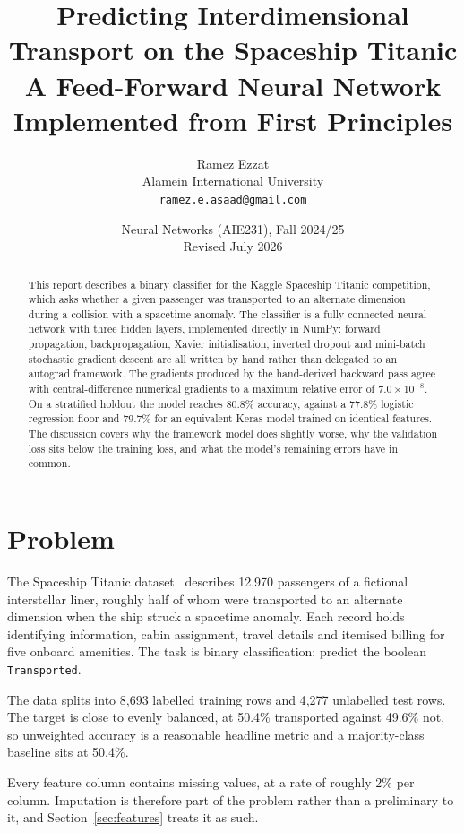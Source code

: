 \documentclass[11pt,a4paper]{article}
\title{\textbf{Predicting Interdimensional Transport on the Spaceship Titanic}\\[0.3em]
       \large A Feed-Forward Neural Network Implemented from First Principles}
\author{Ramez Ezzat\\
        \small Alamein International University\\
        \small \texttt{ramez.e.asaad@gmail.com}}
\date{\small Neural Networks (AIE231), Fall 2024/25 \\ \small Revised July 2026}
\begin{document}
\maketitle

\begin{abstract}
\noindent
This report describes a binary classifier for the Kaggle Spaceship Titanic
competition, which asks whether a given passenger was transported to an
alternate dimension during a collision with a spacetime anomaly. The classifier
is a fully connected neural network with three hidden layers, implemented
directly in NumPy: forward propagation, backpropagation, Xavier initialisation,
inverted dropout and mini-batch stochastic gradient descent are all written by
hand rather than delegated to an autograd framework. The gradients produced by
the hand-derived backward pass agree with central-difference numerical gradients
to a maximum relative error of $7.0\times10^{-8}$. On a stratified holdout the
model reaches 80.8\% accuracy, against a 77.8\% logistic regression floor and
79.7\% for an equivalent Keras model trained on identical features. The
discussion covers why the framework model does slightly worse, why the
validation loss sits below the training loss, and what the model's remaining
errors have in common.
\end{abstract}

\section{Problem}

The Spaceship Titanic dataset~\cite{kaggle} describes 12{,}970 passengers of a
fictional interstellar liner, roughly half of whom were transported to an
alternate dimension when the ship struck a spacetime anomaly. Each record holds
identifying information, cabin assignment, travel details and itemised billing
for five onboard amenities. The task is binary classification: predict the
boolean \texttt{Transported}.

The data splits into 8{,}693 labelled training rows and 4{,}277 unlabelled test
rows. The target is close to evenly balanced, at 50.4\% transported against
49.6\% not, so unweighted accuracy is a reasonable headline metric and a
majority-class baseline sits at 50.4\%.

Every feature column contains missing values, at a rate of roughly 2\% per
column. Imputation is therefore part of the problem rather than a preliminary to
it, and Section~\ref{sec:features} treats it as such.
\end{document}
